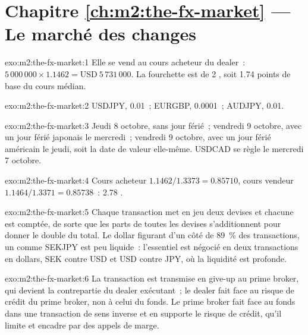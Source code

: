 \section*{Chapitre \ref{ch:m2:the-fx-market} --- Le marché des changes}

\begin{solution}{exo:m2:the-fx-market:1}
Elle se vend au cours acheteur du dealer~: $5\,000\,000 \times 1.1462 = \text{USD}~5\,731\,000$.
La fourchette est de 2 , soit 1.74 points de base du cours médian.
\end{solution}

\begin{solution}{exo:m2:the-fx-market:2}
USDJPY,  0.01~; EURGBP,  0.0001~; AUDJPY,  0.01.
\end{solution}

\begin{solution}{exo:m2:the-fx-market:3}
Jeudi 8 octobre, sans jour férié~; vendredi 9 octobre, avec un jour férié japonais le
mercredi~; vendredi 9 octobre, avec un jour férié américain le jeudi, soit la date de valeur elle-même.
USDCAD se règle le mercredi 7 octobre.
\end{solution}

\begin{solution}{exo:m2:the-fx-market:4}
Cours acheteur $1.1462/1.3373 = 0.85710$, cours vendeur $1.1464/1.3371 = 0.85738$~: 2.78 .
\end{solution}

\begin{solution}{exo:m2:the-fx-market:5}
Chaque transaction met en jeu deux devises et chacune est comptée, de sorte que les parts de toutes
les devises s'additionnent pour donner le double du total. Le dollar figurant d'un côté de 89~\% des transactions,
un  comme SEKJPY est peu liquide~: l'essentiel est négocié en deux transactions en dollars, SEK
contre USD et USD contre JPY, où la liquidité est profonde.
\end{solution}

\begin{solution}{exo:m2:the-fx-market:6}
La transaction est transmise en give-up au prime broker, qui devient la contrepartie
du dealer exécutant~; le dealer fait face au risque de crédit du prime broker, non à celui du fonds. Le
prime broker fait face au fonds dans une transaction de sens inverse et en supporte le risque de crédit,
qu'il limite et encadre par des appels de marge.
\end{solution}

